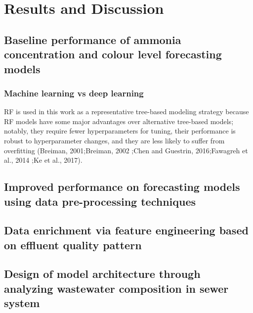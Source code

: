 \chapter{Results and Discussion}
\section{Baseline performance of ammonia concentration and colour level forecasting models}
\subsection{Machine learning vs deep learning}
RF is used in this work as a representative tree-based modeling strategy because RF models have some major advantages over alternative tree-based models; notably, they require fewer hyperparameters for tuning, their performance is robust to hyperparameter changes, and they are less likely to suffer from overfitting (Breiman, 2001;Breiman, 2002 ;Chen and Guestrin, 2016;Fawagreh et al., 2014 ;Ke et al., 2017).
\section{Improved performance on forecasting models using data pre-processing techniques}
\section{Data enrichment via feature engineering based on effluent quality pattern}
\section{Design of model architecture through analyzing wastewater composition in sewer system}
